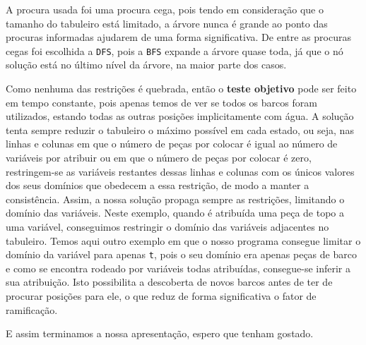 \documentclass[12pt,a4paper]{article}
\begin{document}
A procura usada foi uma procura cega, pois tendo em consideração que o tamanho do tabuleiro está limitado, a árvore nunca é grande
ao ponto das procuras informadas ajudarem de uma forma significativa. De entre as procuras cegas foi escolhida a \texttt{DFS}, pois a \texttt{BFS}
expande a árvore quase toda, já que o nó solução está no último nível da árvore, na maior parte dos casos.

Como nenhuma das restrições é quebrada, então o \textbf{teste objetivo} pode ser feito em tempo constante, pois apenas temos de ver se todos
os barcos foram utilizados, estando todas as outras posições implicitamente com água.
A solução tenta sempre reduzir o tabuleiro o máximo possível em cada estado, ou seja, nas linhas e colunas em que o número de peças por colocar
é igual ao número de variáveis por atribuir ou em que o número de peças por colocar é zero, restringem-se as variáveis restantes dessas
linhas e colunas com os únicos valores dos seus domínios que obedecem a essa restrição, de modo a manter a consistência.
Assim, a nossa solução propaga sempre as restrições, limitando o domínio das variáveis. Neste exemplo, quando é atribuída uma peça de topo a uma variável,
conseguimos restringir o domínio das variáveis adjacentes no tabuleiro.
Temos aqui outro exemplo em que o nosso programa consegue limitar o domínio da variável para apenas \texttt{t}, pois o seu domínio era apenas
peças de barco e como se encontra rodeado por variáveis todas atribuídas, consegue-se inferir a sua atribuição.
Isto possibilita a descoberta de novos barcos antes de ter de procurar posições para ele, o que reduz de forma significativa o fator de ramificação.

E assim terminamos a nossa apresentação, espero que tenham gostado. \smiley{}
\end{document}
